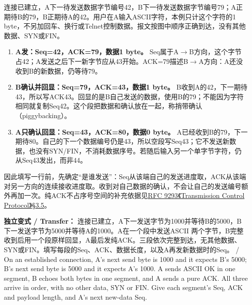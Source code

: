 连接已建立，A下一待发送数据字节编号42，B下一待发送数据字节编号79；A正期待B的79，B正期待A的42。用户在A输入ASCII字符，本例只计这个字符的1 byte，不另加回车、换行或Telnet控制数据。报文按图中顺序正确到达，没有其他数据、SYN或FIN。







\begin{enumerate}[start=1]

\item \textbf{A发：Seq=42，ACK=79，数据1 byte。} Seq属于A\ensuremath{\to}B方向，这个字节占42；A发送之后下一新字节应从43开始。ACK=79描述B\ensuremath{\to}A方向：A还没收到B的新数据，仍等待79。

\item \textbf{B确认并回显：Seq=79，ACK=43，数据1 byte。} B收到A的42，下一期待43，所以写ACK43。回显的是B自己发送的数据，使用B的79；不能因为字符相同就复制Seq42。这个段把数据和确认放在一起，称捎带确认（piggybacking）。

\item \textbf{A只确认回显：Seq=43，ACK=80，数据0 byte。} A已经收到B的79，下一期待80。自己的下一个数据编号仍是43，所以空段写Seq43；它不发送新数据，也没有SYN/FIN，不消耗数据序号。若随后输入另一个单字节字符，仍从Seq43发出，而非44。

\end{enumerate}


因此填写一行前，先确定“是谁发送”：Seq从该端自己的发送进度取，ACK从该端对另一方向的连续接收进度取。收到对自己数据的确认，不会让自己的发送编号额外再加一次。纯ACK不占序号空间的补充依据见\href{https://www.rfc-editor.org/rfc/rfc9293.html\#section-3.5}{RFC 9293《Transmission Control Protocol》§3.5}。


\textbf{独立变式 / Transfer：} 连接已建立，A下一发送字节为1000并等待B的5000，B下一发送字节为5000并等待A的1000。A在一个段中发送ASCII 两个字节，B完整收到后用一个段原样回显，A最后发纯ACK。三段依次完整到达，无其他数据、SYN或FIN。填写每段的Seq、ACK、数据长度，以及A再发新数据时的Seq。 / On an established connection, A's next send byte is 1000 and it expects B's 5000; B's next send byte is 5000 and it expects A's 1000. A sends ASCII OK in one segment, B echoes both bytes in one segment, and A sends a pure ACK. All three arrive in order, with no other data, SYN or FIN. Give each segment's Seq, ACK and payload length, and A's next new-data Seq.



